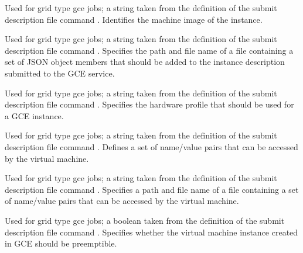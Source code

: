 \begin{description}
\item[\AdAttr{GceImage}:] 
Used for grid type gce jobs;
a string taken from the definition of the submit description file command
.
Identifies the machine image of the instance.

\item[\AdAttr{GceJsonFile}:]
Used for grid type gce jobs;
a string taken from the definition of the submit description file command
.
Specifies the path and file name of a file containing
a set of JSON object members that should be added to the instance
description submitted to the GCE service.

\item[\AdAttr{GceMachineType}:] 
Used for grid type gce jobs;
a string taken from the definition of the submit description file command
.
Specifies the hardware profile that should be used for a GCE instance.

\item[\AdAttr{GceMetadata}:] 
Used for grid type gce jobs;
a string taken from the definition of the submit description file command
.
Defines a set of name/value pairs that can be accessed by the virtual machine.

\item[\AdAttr{GceMetadataFile}:] 
Used for grid type gce jobs;
a string taken from the definition of the submit description file command
.
Specifies a path and file name of a file containing 
a set of name/value pairs that can be accessed by the virtual machine.

\item[\AdAttr{GcePreemptible}:]
Used for grid type gce jobs;
a boolean taken from the definition of the submit description file command
.
Specifies whether the virtual machine instance created in GCE should
be preemptible.


\end{description}
